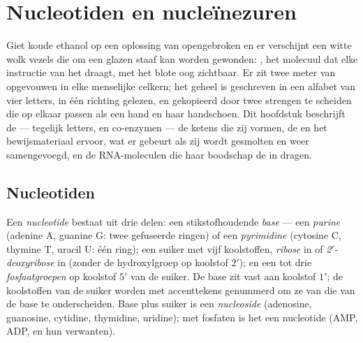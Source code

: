 \chapter{Nucleotiden en nucleïnezuren}\label{ch:b1:nucleic-acids}

Giet koude ethanol op een oplossing van opengebroken  en er verschijnt een
witte wolk vezels die om een glazen staaf kan worden gewonden: , het molecuul
dat elke instructie van het  draagt, met het blote oog zichtbaar. Er zit
twee meter van opgevouwen in elke menselijke celkern; het geheel is geschreven in
een alfabet van vier letters, in één richting gelezen, en gekopieerd door twee
strengen te scheiden die op elkaar passen als een hand en haar handschoen. Dit
hoofdstuk beschrijft de  --- tegelijk letters,  en
co-enzymen --- de ketens die zij vormen, de  en het bewijsmateriaal
ervoor, wat er gebeurt als zij wordt gesmolten en weer samengevoegd, en de
RNA-moleculen die haar boodschap de  in dragen.

\section{Nucleotiden}

\begin{definition}[Nucleotide]\label{def:b1:nucleic-acids:nucleotide}
Een \emph{nucleotide} bestaat uit drie delen: een
stikstofhoudende \emph{base} --- een
\emph{purine} (adenine A, guanine G: twee gefuseerde ringen) of een
\emph{pyrimidine} (cytosine C, thymine T, uracil U: één ring);
een suiker met vijf koolstoffen, \emph{ribose} in  of
\emph{2$'$-deoxyribose} in  (zonder de hydroxylgroep op koolstof $2'$); en een
tot drie \emph{fosfaatgroepen} op koolstof $5'$ van de suiker. De base zit vast
aan koolstof $1'$; de koolstoffen van de suiker worden met accenttekens genummerd
om ze van die van de base te onderscheiden. Base plus suiker is een
\emph{nucleoside} (adenosine, guanosine, cytidine, thymidine, uridine); met
fosfaten is het een nucleotide (AMP, ADP,  en hun verwanten).
\end{definition}


